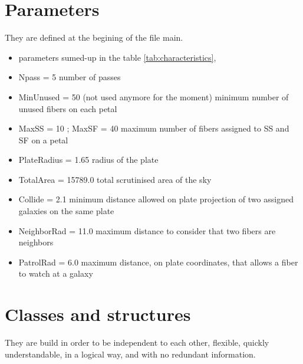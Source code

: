 \documentclass{article}
\begin{document}
\section{Parameters}
They are defined at the begining of the file main.
\begin{itemize} 
	\item parameters sumed-up in the table \ref{tab:characteristics},
	\item Npass = 5 number of passes
	\item MinUnused = 50 (not used anymore for the moment) minimum number of unused fibers on each petal
	\item MaxSS = 10 ; MaxSF = 40 maximum number of fibers assigned to SS and SF on a petal
	\item PlateRadius = 1.65 radius of the plate
	\item TotalArea = 15789.0 total scrutinised area of the sky
	\item Collide = 2.1 minimum distance allowed on plate projection of two assigned galaxies on the same plate
	\item NeighborRad = 11.0 maximum distance to consider that two fibers are neighbors
	\item PatrolRad = 6.0 maximum distance, on plate coordinates, that allows a fiber to watch at a galaxy
\end{itemize} 


\section{Classes and structures}
They are build in order to be independent to each other, flexible, quickly understandable, in a logical way, and with no redundant information.
\end{document}
